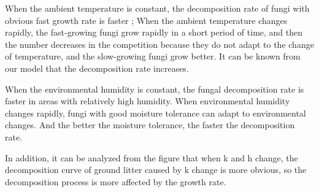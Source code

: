 \documentclass{mcmthesis}
\begin{document}
When the ambient temperature is constant, the decomposition rate of fungi with obvious fast growth rate is faster ; When the ambient temperature changes rapidly, the fast-growing fungi grow rapidly in a short period of time, and then the number decreases in the competition because they do not adapt to the change of temperature, and the slow-growing fungi grow better. It can be known from our model that the decomposition rate increases.       

When the environmental humidity is constant, the fungal decomposition rate is faster in areas with relatively high humidity. When environmental humidity changes rapidly, fungi with good moisture tolerance can adapt to environmental changes. And the better the moisture tolerance, the faster the decomposition rate.

In addition, it can be analyzed from the figure that when k and h change, the decomposition curve of ground litter caused by k change is more obvious, so the decomposition process is more affected by the growth rate.
\end{document}
